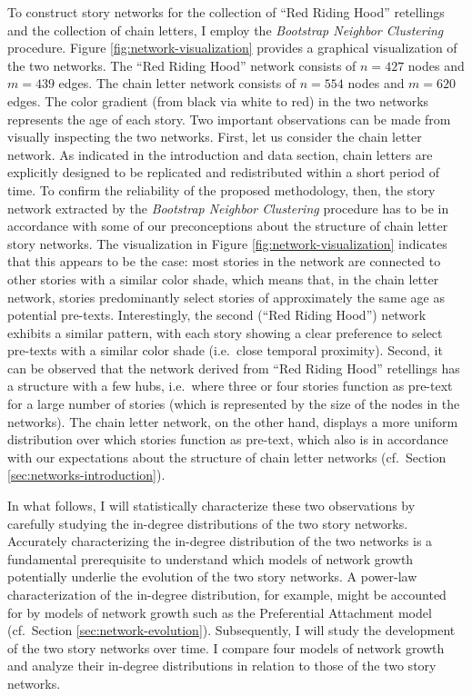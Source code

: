 To construct story networks for the collection of ``Red Riding Hood'' retellings and the collection of chain letters, I employ the \emph{Bootstrap Neighbor Clustering} procedure. Figure \ref{fig:network-visualization} provides a graphical visualization of the two networks. The ``Red Riding Hood'' network consists of $n=427$ nodes and $m=439$ edges. The chain letter network consists of $n=554$ nodes and $m=620$ edges. The color gradient (from black via white to red) in the two networks represents the age of each story. Two important observations can be made from visually inspecting the two networks. First, let us consider the chain letter network. As indicated in the introduction and data section, chain letters are explicitly designed to be replicated and redistributed within a short period of time. To confirm the reliability of the proposed methodology, then, the story network extracted by the \emph{Bootstrap Neighbor Clustering} procedure has to be in accordance with some of our preconceptions about the structure of chain letter story networks. The visualization in Figure \ref{fig:network-visualization} indicates that this appears to be the case: most stories in the network are connected to other stories with a similar color shade, which means that, in the chain letter network, stories predominantly select stories of approximately the same age as potential pre-texts. Interestingly, the second (``Red Riding Hood'') network exhibits a similar pattern, with each story showing a clear preference to select pre-texts with a similar color shade (i.e.\ close temporal proximity). Second, it can be observed that the network derived from ``Red Riding Hood'' retellings has a structure with a few hubs, i.e.\ where three or four stories function as pre-text for a large number of stories (which is represented by the size of the nodes in the networks). The chain letter network, on the other hand, displays a more uniform distribution over which stories function as pre-text, which also is in accordance with our expectations about the structure of chain letter networks (cf.\ Section \ref{sec:networks-introduction}).

In what follows, I will statistically characterize these two observations by carefully studying the in-degree distributions of the two story networks. Accurately characterizing the in-degree distribution of the two networks is a fundamental prerequisite to understand which models of network growth potentially underlie the evolution of the two story networks. A power-law characterization of the in-degree distribution, for example, might be accounted for by models of network growth such as the Preferential Attachment model (cf.\ Section \ref{sec:network-evolution}). Subsequently, I will study the development of the two story networks over time. I compare four models of network growth and analyze their in-degree distributions in relation to those of the two story networks.

